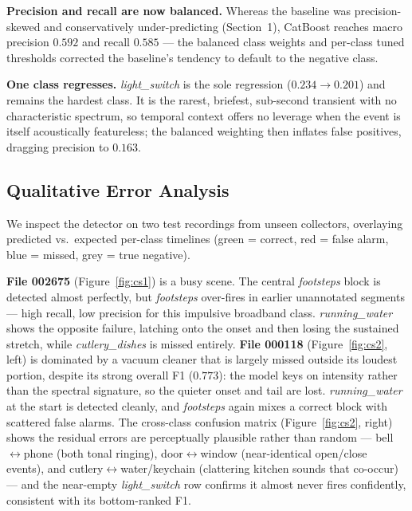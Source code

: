 \documentclass{article}
\begin{document}
\textbf{Precision and recall are now balanced.} Whereas the baseline was precision-skewed and conservatively under-predicting (Section~1), CatBoost reaches macro precision $0.592$ and recall $0.585$ --- the balanced class weights and per-class tuned thresholds corrected the baseline's tendency to default to the negative class.

\textbf{One class regresses.} \emph{light\_switch} is the sole regression ($0.234\!\rightarrow\!0.201$) and remains the hardest class. It is the rarest, briefest, sub-second transient with no characteristic spectrum, so temporal context offers no leverage when the event is itself acoustically featureless; the balanced weighting then inflates false positives, dragging precision to $0.163$.

\subsection{Qualitative Error Analysis}

We inspect the detector on two test recordings from unseen collectors, overlaying predicted vs.\ expected per-class timelines (green = correct, red = false alarm, blue = missed, grey = true negative).

\textbf{File 002675} (Figure~\ref{fig:cs1}) is a busy scene. The central \emph{footsteps} block is detected almost perfectly, but \emph{footsteps} over-fires in earlier unannotated segments --- high recall, low precision for this impulsive broadband class. \emph{running\_water} shows the opposite failure, latching onto the onset and then losing the sustained stretch, while \emph{cutlery\_dishes} is missed entirely. \textbf{File 000118} (Figure~\ref{fig:cs2}, left) is dominated by a vacuum cleaner that is largely missed outside its loudest portion, despite its strong overall F1 ($0.773$): the model keys on intensity rather than the spectral signature, so the quieter onset and tail are lost. \emph{running\_water} at the start is detected cleanly, and \emph{footsteps} again mixes a correct block with scattered false alarms. The cross-class confusion matrix (Figure~\ref{fig:cs2}, right) shows the residual errors are perceptually plausible rather than random --- bell$\leftrightarrow$phone (both tonal ringing), door$\leftrightarrow$window (near-identical open/close events), and cutlery$\leftrightarrow$water/keychain (clattering kitchen sounds that co-occur) --- and the near-empty \emph{light\_switch} row confirms it almost never fires confidently, consistent with its bottom-ranked F1.
\end{document}

